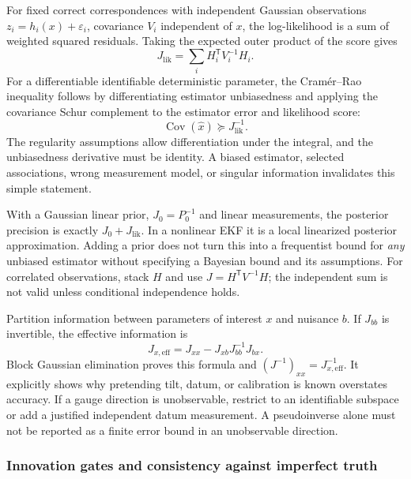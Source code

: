 For fixed correct correspondences with independent Gaussian observations
$z_i=h_i(x)+\varepsilon_i$, covariance $V_i$ independent of $x$, the
log-likelihood is a sum of weighted squared residuals. Taking the
expected outer product of the score gives
\begin{equation}
 J_{\mathrm{lik}}=\sum_i H_i^{\mathsf T}V_i^{-1}H_i.
\end{equation}
For a differentiable identifiable deterministic parameter, the
Cram\'er--Rao inequality follows by differentiating estimator
unbiasedness and applying the covariance Schur complement to the
estimator error and likelihood score:
\begin{equation}
 \operatorname{Cov}(\widehat x)\succeq J_{\mathrm{lik}}^{-1}.
\end{equation}
The regularity assumptions allow differentiation under the integral,
and the unbiasedness derivative must be identity. A biased estimator,
selected associations, wrong measurement model, or singular information
invalidates this simple statement.

With a Gaussian linear prior, $J_0=P_0^{-1}$ and linear measurements,
the posterior precision is exactly $J_0+J_{\mathrm{lik}}$. In a nonlinear
EKF it is a local linearized posterior approximation. Adding a prior
does not turn this into a frequentist bound for \emph{any} unbiased
estimator without specifying a Bayesian bound and its assumptions.
For correlated observations, stack $H$ and use $J=H^{\mathsf T}V^{-1}H$;
the independent sum is not valid unless conditional independence holds.

Partition information between parameters of interest $x$ and nuisance
$b$. If $J_{bb}$ is invertible, the effective information is
\begin{equation}
 J_{x,\mathrm{eff}}=J_{xx}-J_{xb}J_{bb}^{-1}J_{bx}.
\end{equation}
Block Gaussian elimination proves this formula and
$(J^{-1})_{xx}=J_{x,\mathrm{eff}}^{-1}$. It explicitly shows why
pretending tilt, datum, or calibration is known overstates accuracy.
If a gauge direction is unobservable, restrict to an identifiable
subspace or add a justified independent datum measurement. A
pseudoinverse alone must not be reported as a finite error bound in an
unobservable direction.

\subsubsection{Innovation gates and consistency against imperfect truth}

